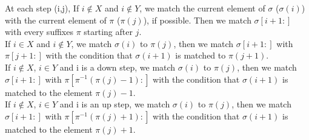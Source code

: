 \documentclass[a4paper]{llncs}
\newcommand{\ptext}{\pi}
\newcommand{\pmotif}{\sigma}
\newcommand{\x}{X}
\newcommand{\y}{Y}
\newcommand{\bmotif}{(\sigma,\x,\y)}
\newcommand{\dstep}{d}
\newcommand{\ustep}{u}
\begin{document}
%						
%							
						
			At each step (i,j),
			If $i \notin \x$ and $i \notin \y$,
			we match the current element of $\pmotif$ ($\pmotif(i)$)
			with the current element of $\ptext$ ($\ptext(j)$), if possible.
			Then we match $\pmotif[i+1:]$ with 
			every suffixes $\ptext$ starting after $j$.\\
			
			If $i \in \x$ and $i \notin \y$,
			we match $\pmotif(i)$ to $\ptext(j)$, 
			then we match $\pmotif[i+1:]$ with $\ptext[j+1:]$
			with the condition that
			$\pmotif(i+1)$ is matched to $\ptext(j+1)$.\\
			
			If $i \notin \x$, $i \in \y$ and i is a down step,
			we match $\pmotif(i)$ to $\ptext(j)$, 
			then we match $\pmotif[i+1:]$ 
			with $\ptext[\ptext^{-1}(\ptext(j)-1):]$
			with the condition that
			$\pmotif(i+1)$ is matched to the element $\ptext(j)-1$.\\						
			
			If $i \notin \x$, $i \in \y$ and i is an up step,
			we match $\pmotif(i)$ to $\ptext(j)$, 
			then we match $\pmotif[i+1:]$ 
			with $\ptext[\ptext^{-1}(\ptext(j)+1):]$
			with the condition that
			$\pmotif(i+1)$ is matched to the element $\ptext(j)+1$.\\	
\end{document}
